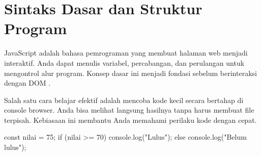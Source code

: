 \section{Sintaks Dasar dan Struktur Program}
JavaScript adalah bahasa pemrograman yang membuat halaman web menjadi interaktif. Anda dapat menulis variabel, percabangan, dan perulangan untuk mengontrol alur program. Konsep dasar ini menjadi fondasi sebelum berinteraksi dengan DOM \cite{jsInfo}.

Salah satu cara belajar efektif adalah mencoba kode kecil secara bertahap di console browser. Anda bisa melihat langsung hasilnya tanpa harus membuat file terpisah. Kebiasaan ini membantu Anda memahami perilaku kode dengan cepat.

\begin{webcode}[language=JavaScript, caption={Contoh Variabel dan Percabangan}]
const nilai = 75;
if (nilai >= 70) {
  console.log("Lulus");
} else {
  console.log("Belum lulus");
}
\end{webcode}

